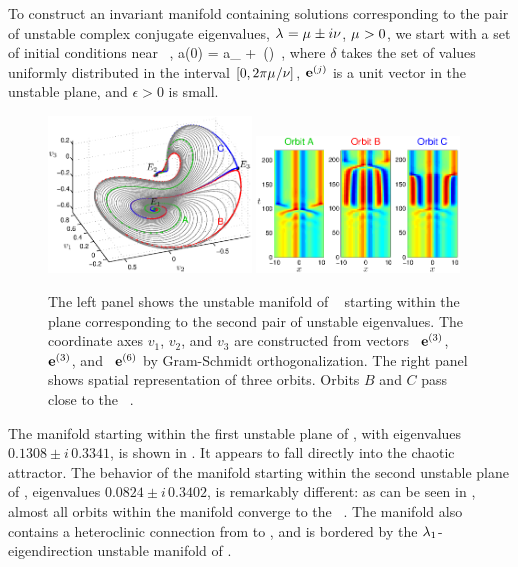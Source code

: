 To construct an invariant manifold containing solutions
corresponding to the pair of unstable complex conjugate eigenvalues,
$\eigExp = \eigRe \pm i\eigIm$,
$\eigRe > 0$, we start with a set of
initial conditions near \eqv\ ,
\beq
  a(0) = a_{{}} + \epsilon\,\exp(\delta)
\,,
where $\delta$ takes the set of values uniformly distributed in the
interval $[0,2\pi\eigRe/\eigIm]$, $\jEigvec{j}$ is a unit vector in the
unstable plane, and $\epsilon > 0$ is small.

\begin{figure}[t]
\begin{center}
\includegraphics[width=0.48\textwidth, clip=true]{figs/ks22_E1_plane2_manifold_c.eps}
\includegraphics[width=0.48\textwidth, clip=true]{figs/ks22_E1_plane2_orbits_c.eps}
\end{center}
\caption{
The left panel shows the unstable
manifold of \eqv\  starting within the plane
corresponding to the second pair of unstable eigenvalues. The
coordinate axes $v_1$, $v_2$, and $v_3$ are constructed from vectors
\Re\, $\jEigvec{3}$, \Im\, $\jEigvec{3}$, and \Re\, $\jEigvec{6}$
by Gram-Schmidt orthogonalization.
The right panel shows spatial representation of three orbits. Orbits
$B$ and $C$ pass close to the \eqv\ .
   }
\label{f:KS22E1man2}
\end{figure}

The manifold starting within the first unstable plane of , with
eigenvalues $0.1308\pm i\,0.3341$, is shown in
. It appears to fall directly into the
chaotic attractor.  The behavior of the manifold starting within
the second unstable plane of , eigenvalues $0.0824\pm i \, 0.3402$, is
remarkably different: as can be seen in ,
almost all orbits within the manifold converge to the \eqv\ .  The
manifold also contains a heteroclinic connection from  to ,
and is bordered by the $\eigExp[1]$-eigendirection
unstable manifold of .

